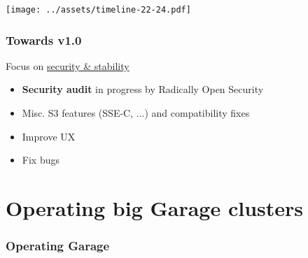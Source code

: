 \documentclass[aspectratio=169]{beamer}
\begin{document}

\begin{frame}
	\begin{center}
		\texttt{[image: ../assets/timeline-22-24.pdf]}
	\end{center}
\end{frame}

\begin{frame}
	\frametitle{Towards v1.0}
	Focus on \underline{security \& stability}
	\vspace{2em}
	\begin{itemize}
		\item \textbf{Security audit} in progress by Radically Open Security
			\vspace{1em}
		\item Misc. S3 features (SSE-C, ...) and compatibility fixes
			\vspace{1em}
		\item Improve UX
			\vspace{1em}
		\item Fix bugs
	\end{itemize}
\end{frame}



\section{Operating big Garage clusters}

\begin{frame}
	\frametitle{Operating Garage}
	\begin{center}
	\end{center}
\end{frame}
\end{document}
